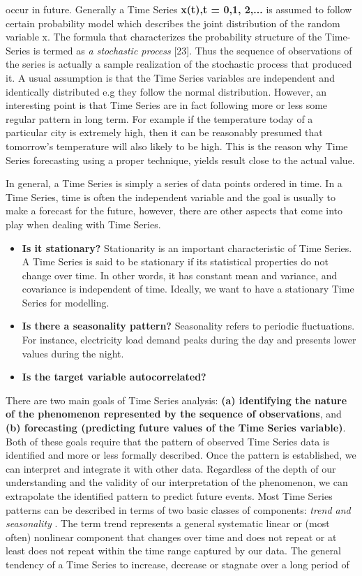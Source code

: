 occur in future. Generally a Time Series \textbf{{x(t),t = 0,1, 2,...}} is assumed to follow certain
probability model which describes the joint distribution of the random variable x. The formula that characterizes the probability structure of the Time-Series is termed as \textit{a
stochastic process} [23]. Thus the sequence of observations of the series is actually a sample
realization of the stochastic process that produced it.
A usual assumption is that the Time Series variables are independent and identically
distributed e.g they follow the normal distribution. However, an
interesting point is that Time Series are in fact following more or less some
regular pattern in long term. For example if the temperature today of a particular city is
extremely high, then it can be reasonably presumed that tomorrow’s temperature will also
likely to be high. This is the reason why Time Series forecasting using a proper technique,
yields result close to the actual value.
\par 
In general, a Time Series is simply a series of data points ordered in time. In a Time Series, time is often the independent variable and the goal is usually to make a forecast for the future, however, there are other aspects that come into play when dealing with Time Series.
\begin{itemize}
    \item \textbf{Is it stationary?} Stationarity is an important characteristic of Time Series. A Time Series is said to be stationary if its statistical properties do not change over time. In other words, it has constant mean and variance, and covariance is independent of time. Ideally, we want to have a stationary Time Series for modelling.
    \item \textbf{Is there a seasonality pattern?} Seasonality refers to periodic fluctuations. For instance, electricity load demand peaks during the day and presents lower values during the night.
    \item \textbf{Is the target variable autocorrelated?}
\end{itemize}
\par There are two main goals of Time Series analysis: \textbf {(a) identifying the nature of the phenomenon represented by the sequence of observations}, and \textbf{(b) forecasting (predicting future values of the Time Series variable)}. Both of these goals require that the pattern of observed Time Series data is identified and more or less formally described. Once the pattern is established, we can interpret and integrate it with other data. Regardless of the depth of our understanding and the validity of our interpretation of the phenomenon, we can extrapolate the identified pattern to predict future events. Most Time Series patterns can be described in terms of two basic classes of components: \textit{trend and seasonality} \cite{box2015time}. The term trend represents a general systematic linear or (most often) nonlinear component that changes over time and does not repeat or at least does not repeat within the time range captured by our data. The general tendency of a Time Series to increase, decrease or stagnate over a long period of
